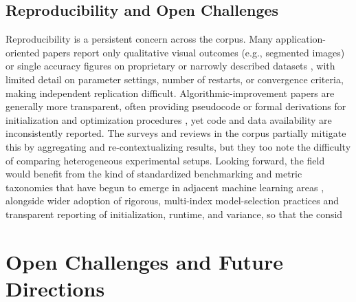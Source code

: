 \subsection{Reproducibility and Open Challenges}
Reproducibility is a persistent concern across the corpus. Many application-oriented papers report only qualitative visual outcomes (e.g., segmented images) or single accuracy figures on proprietary or narrowly described datasets \cite{zhu2022means,zhang2023metal,wang2016method}, with limited detail on parameter settings, number of restarts, or convergence criteria, making independent replication difficult. Algorithmic-improvement papers are generally more transparent, often providing pseudocode or formal derivations for initialization \cite{aldahdooh2013dimk,kumar2017density,agha2012efficient} and optimization procedures \cite{zubair2022improved,zhao2022design}, yet code and data availability are inconsistently reported. The surveys and reviews in the corpus \cite{chong2021means,oti2021comprehensive,sattarov2023unveiling,mukherjee2025survey,mussabayev2023comparative} partially mitigate this by aggregating and re-contextualizing results, but they too note the difficulty of comparing heterogeneous experimental setups. Looking forward, the field would benefit from the kind of standardized benchmarking and metric taxonomies that have begun to emerge in adjacent machine learning areas \cite{terven2025comprehensive,srb2023navigating,benny2021evaluation}, alongside wider adoption of rigorous, multi-index model-selection practices \cite{ikotun2025cluster,schubert2023stop} and transparent reporting of initialization, runtime, and variance, so that the consid

\section{Open Challenges and Future Directions}\label{sec:challenges}

